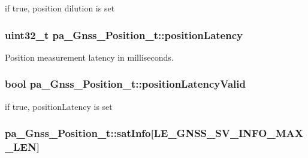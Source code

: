 if true, position dilution is set 

\subsubsection[{\texorpdfstring{position\+Latency}{positionLatency}}]{\setlength{\rightskip}{0pt plus 5cm}uint32\+\_\+t pa\+\_\+\+Gnss\+\_\+\+Position\+\_\+t\+::position\+Latency}\hypertarget{structpa___gnss___position__t_a2160a82427b81ea95e5427eb6ff302ee}{}\label{structpa___gnss___position__t_a2160a82427b81ea95e5427eb6ff302ee}


Position measurement latency in milliseconds. 

\subsubsection[{\texorpdfstring{position\+Latency\+Valid}{positionLatencyValid}}]{\setlength{\rightskip}{0pt plus 5cm}bool pa\+\_\+\+Gnss\+\_\+\+Position\+\_\+t\+::position\+Latency\+Valid}\hypertarget{structpa___gnss___position__t_a74a7abe0ccd0b4ef8cadc0907b9afeba}{}\label{structpa___gnss___position__t_a74a7abe0ccd0b4ef8cadc0907b9afeba}


if true, position\+Latency is set 

\subsubsection[{\texorpdfstring{sat\+Info}{satInfo}}]{ pa\+\_\+\+Gnss\+\_\+\+Position\+\_\+t\+::sat\+Info\mbox{[}{\bf L\+E\+\_\+\+G\+N\+S\+S\+\_\+\+S\+V\+\_\+\+I\+N\+F\+O\+\_\+\+M\+A\+X\+\_\+\+L\+EN}\mbox{]}}\hypertarget{structpa___gnss___position__t_a70397aee152ea46265e9ec805e716c88}{}\label{structpa___gnss___position__t_a70397aee152ea46265e9ec805e716c88}


